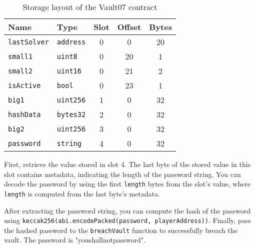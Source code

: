 \documentclass[12pt]{article}
\begin{document}
\begin{table}[h!]
    \centering
    \begin{tabular}{|l|l|c|c|c|}
        \hline
        \textbf{Name}      & \textbf{Type}    & \textbf{Slot} & \textbf{Offset} & \textbf{Bytes} \\ \hline
        \texttt{lastSolver} & \texttt{address} & 0             & 0               & 20             \\ \hline
        \texttt{small1}    & \texttt{uint8}   & 0             & 20              & 1              \\ \hline
        \texttt{small2}    & \texttt{uint16}  & 0             & 21              & 2              \\ \hline
        \texttt{isActive}  & \texttt{bool}    & 0             & 23              & 1              \\ \hline
        \texttt{big1}      & \texttt{uint256} & 1             & 0               & 32             \\ \hline
        \texttt{hashData}  & \texttt{bytes32} & 2             & 0               & 32             \\ \hline
        \texttt{big2}      & \texttt{uint256} & 3             & 0               & 32             \\ \hline
        \texttt{password}  & \texttt{string}  & 4             & 0               & 32             \\ \hline
    \end{tabular}
    \caption{Storage layout of the Vault07 contract}
    \label{tab:vault07_storage}
\end{table}


First, retrieve the value stored in slot 4. The last byte of the stored value in this slot contains metadata, indicating the length of the password string. You can decode the password by using the first \texttt{length} bytes from the slot's value, where \texttt{length} is computed from the last byte's metadata.

After extracting the password string, you can compute the hash of the password using \texttt{keccak256(abi.encodePacked(password, playerAddress))}. Finally, pass the hashed password to the \texttt{breachVault} function to successfully breach the vault. The password is "youshallnotpassword".
\end{document}
